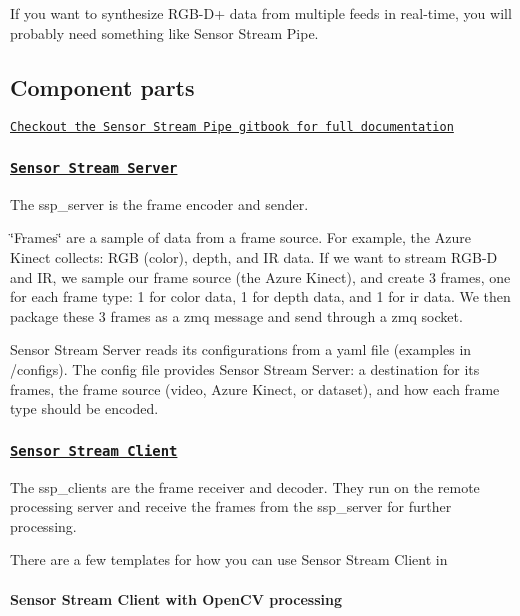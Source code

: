 If you want to synthesize R\+G\+B-\/\+D+ data from multiple feeds in real-\/time, you will probably need something like Sensor Stream Pipe.

\subsection*{Component parts}

\href{https://moetsi.gitbook.io/sensor-stream-pipe/}{\tt Checkout the Sensor Stream Pipe gitbook for full documentation}

\subsubsection*{\href{https://moetsi.gitbook.io/sensor-stream-pipe/components-overview/sensor-stream-server}{\tt Sensor Stream Server}}

The ssp\+\_\+server is the frame encoder and sender.

\char`\"{}\+Frames\char`\"{} are a sample of data from a frame source. For example, the Azure Kinect collects\+: R\+GB (color), depth, and IR data. If we want to stream R\+G\+B-\/D and IR, we sample our frame source (the Azure Kinect), and create 3 frames, one for each frame type\+: 1 for color data, 1 for depth data, and 1 for ir data. We then package these 3 frames as a zmq message and send through a zmq socket.

Sensor Stream Server reads its configurations from a yaml file (examples in /configs). The config file provides Sensor Stream Server\+: a destination for its frames, the frame source (video, Azure Kinect, or dataset), and how each frame type should be encoded.

\subsubsection*{\href{https://moetsi.gitbook.io/sensor-stream-pipe/components-overview/sensor-stream-client}{\tt Sensor Stream Client}}

The ssp\+\_\+clients are the frame receiver and decoder. They run on the remote processing server and receive the frames from the ssp\+\_\+server for further processing.

There are a few templates for how you can use Sensor Stream Client in

\paragraph*{Sensor Stream Client with Open\+CV processing}

